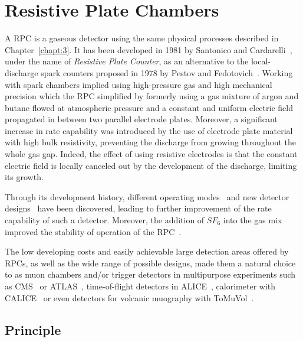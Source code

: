 \renewcommand\evenpagerightmark{{\scshape\small Chapter 4}}
\renewcommand\oddpageleftmark{{\scshape\small Resistive Plate Chambers}}

\renewcommand{\bibname}{References}

\hyphenation{}

\chapter[Resistive Plate Chambers]%
{Resistive Plate Chambers}
\label{chapt:4}

	A \acf{RPC} is a gaseous detector using the same physical processes described in Chapter~\ref{chapt:3}. It has been developed in 1981 by Santonico and Cardarelli~\cite{SANTONICO81}, under the name of \textit{Resistive Plate Counter}, as an alternative to the local-discharge spark counters proposed in 1978 by Pestov and Fedotovich~\cite{PESTOV78,FEDOTOVICH82}. Working with spark chambers implied using high-pressure gas and high mechanical precision which the RPC simplified by formerly using a gas mixture of argon and butane flowed at atmospheric pressure and a constant and uniform electric field propagated in between two parallel electrode plates. Moreover, a significant increase in rate capability was introduced by the use of electrode plate material with high bulk resistivity, preventing the discharge from growing throughout the whole gas gap. Indeed, the effect of using resistive electrodes is that the constant electric field is locally canceled out by the development of the discharge, limiting its growth.
	
	Through its development history, different operating modes~\cite{CROTTY93,CROTTY94,CARDARELLI96} and new detector designs~\cite{ZEBALLOS96MRPC,WILLIAMS98,CZYRKOWSKI98} have been discovered, leading to further improvement of the rate capability of such a detector. Moreover, the addition of $SF_6$ into the gas mix improved the stability of operation of the RPC~\cite{CAMARRI98,ZEBALLOS98}.
	
	The low developing costs and easily achievable large detection areas offered by RPCs, as well as the wide range of possible designs, made them a natural choice to as muon chambers and/or trigger detectors in multipurpose experiments such as CMS~\cite{MUONTDR} or ATLAS~\cite{ATLASTDR}, time-of-flight detectors in ALICE~\cite{ALICETDR}, calorimeter with CALICE~\cite{CALICE2016} or even detectors for volcanic muography with ToMuVol~\cite{TOMUVOL2011}. 

\section{Principle}
\label{chapt4:sec:principle}

